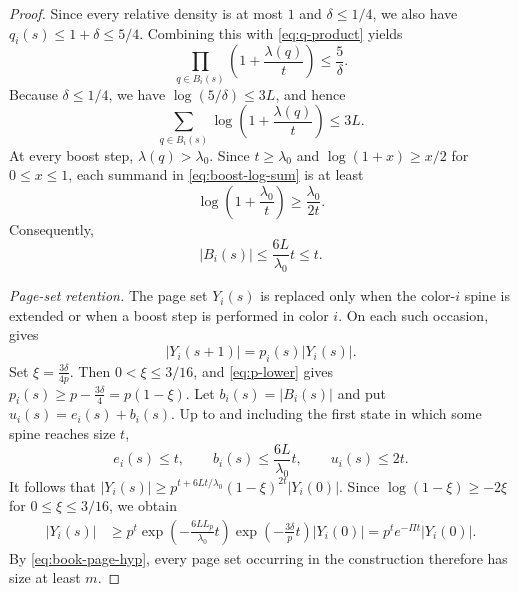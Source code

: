 \documentclass[10pt,a4paper]{amsart}
\begin{document}
\begin{proof}
Since every relative density is at most $1$ and $\delta\le1/4$, we also have
$q_i(s)\le1+\delta\le5/4$. Combining this with \eqref{eq:q-product} yields
\[
 \prod_{q\in B_i(s)}\left(1+\frac{\lambda(q)}t\right)
 \le\frac5\delta.
\]
Because $\delta\le1/4$, we have $\log(5/\delta)\le3L$, and hence
\begin{equation}\label{eq:boost-log-sum}
 \sum_{q\in B_i(s)}
 \log\left(1+\frac{\lambda(q)}t\right)
 \le3L.
\end{equation}
At every boost step, $\lambda(q)>\lambda_0$. Since $t\ge\lambda_0$ and
$\log(1+x)\ge x/2$ for $0\le x\le1$, each summand in
\eqref{eq:boost-log-sum} is at least
\[
 \log\left(1+\frac{\lambda_0}{t}\right)
 \ge\frac{\lambda_0}{2t}.
\]
Consequently,
\begin{equation}\label{eq:boost-count}
 |B_i(s)|\le\frac{6L}{\lambda_0}t\le t.
\end{equation}

\medskip
\noindent\emph{Page-set retention.}
The page set $Y_i(s)$ is replaced only when the color-$i$ spine is extended
or when a boost step is performed in color $i$. On each such occasion,
 gives
\[
 |Y_i(s+1)|=p_i(s)|Y_i(s)|.
\]
Set
$\xi=\frac{3\delta}{4p}.$
Then $0<\xi\le3/16$, and \eqref{eq:p-lower} gives
$
 p_i(s)\ge p-\frac{3\delta}{4}=p(1-\xi).
$
Let $b_i(s)=|B_i(s)|$ and put $u_i(s)=e_i(s)+b_i(s)$. Up to and including
the first state in which some spine reaches size $t$,
\[
 e_i(s)\le t,
 \qquad
 b_i(s)\le\frac{6L}{\lambda_0}t,
 \qquad
 u_i(s)\le2t.
\]
It follows that
$
 |Y_i(s)|
 \ge p^{t+6Lt/\lambda_0}(1-\xi)^{2t}|Y_i(0)|.
$
Since $\log(1-\xi)\ge-2\xi$ for $0\le\xi\le3/16$, we obtain
\begin{align}
 |Y_i(s)|
 &\ge p^t
 \exp\!\left(-\frac{6LL_p}{\lambda_0}t\right)
 \exp\!\left(-\frac{3\delta}{p}t\right)|Y_i(0)|=p^te^{-\Pi t}|Y_i(0)|.
 \label{eq:page-retention}
\end{align}
By \eqref{eq:book-page-hyp}, every page set occurring in the construction
therefore has size at least $m$.


\end{proof}
\end{document}
